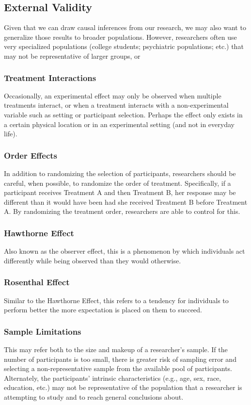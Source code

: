 \subsection{External Validity} 

Given that we can draw causal inferences from our research, we may also want to generalize those results to broader populations. However, researchers often use very specialized populations (college students; psychiatric populations; etc.) that may not be representative of larger groups, or 

\subsubsection{Treatment Interactions}
Occasionally, an experimental effect may only be observed when multiple treatments interact, or when a treatment interacts with a non-experimental variable such as setting or participant selection. Perhaps the effect only exists in a certain physical location or in an experimental setting (and not in everyday life).

\subsubsection{Order Effects}
In addition to randomizing the selection of participants, researchers should be careful, when possible, to randomize the order of treatment. Specifically, if a participant receives Treatment A and then Treatment B, her response may be different than it would have been had she received Treatment B before Treatment A. By randomizing the treatment order, researchers are able to control for this.

\subsubsection{Hawthorne Effect}
Also known as the observer effect, this is a phenomenon by which individuals act differently while being observed than they would otherwise.

\subsubsection{Rosenthal Effect}
Similar to the Hawthorne Effect, this refers to a tendency for individuals to perform better the more expectation is placed on them to succeed.

\subsubsection{Sample Limitations}
This may refer both to the size and makeup of a researcher's sample. If the number of participants is too small, there is greater risk of sampling error and selecting a non-representative sample from the available pool of participants. Alternately, the participants' intrinsic characteristics (e.g., age, sex, race, education, etc.) may not be representative of the population that a researcher is attempting to study and to reach general conclusions about.